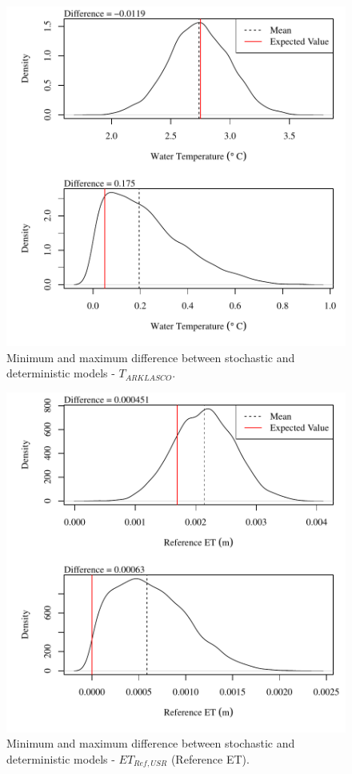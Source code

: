\begin{center}
\begin{figure}[htbp]
	\includegraphics[width=6in]{"Figures/Results_USR/V min-max diff tout"}
	\caption{Minimum and maximum difference between stochastic and deterministic models - $T_{ARKLASCO}$.}
\end{figure}
\end{center}
\newpage

\begin{center}
\begin{figure}[htbp]
	\includegraphics[width=6in]{"Figures/Results_USR/V min-max diff et"}
	\caption{Minimum and maximum difference between stochastic and deterministic models - $ET_{Ref,USR}$ (Reference ET).}
\end{figure}
\end{center}
\newpage

